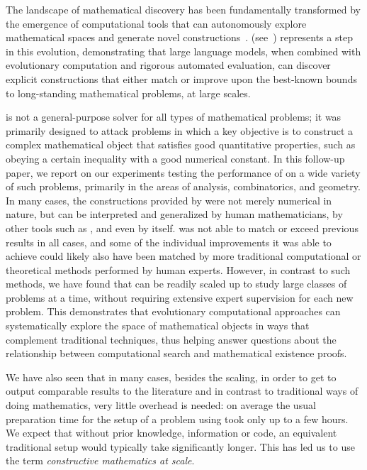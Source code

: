 The landscape of mathematical discovery has been fundamentally transformed by the emergence of computational tools that can autonomously explore mathematical spaces and generate novel constructions~\cite{charton2024patternboost, fawzi2022discovering,  romeraparedes2023mathematical, Wagner2021}.  \AlphaEvolve (see~\cite{novikov2025alphaevolve}) represents a step in this evolution, demonstrating that large language models, when combined with evolutionary computation and rigorous automated evaluation, can discover explicit constructions that either match or improve upon the best-known bounds to long-standing mathematical problems, at large scales.

\AlphaEvolve is not a general-purpose solver for all types of mathematical problems; it was primarily designed to attack problems in which a key objective is to construct a complex mathematical object that satisfies good quantitative properties, such as obeying a certain inequality with a good numerical constant.  In this follow-up paper, we report on our experiments testing the performance of \AlphaEvolve on a wide variety of such problems, primarily in the areas of analysis, combinatorics, and geometry.  In many cases, the constructions provided by \AlphaEvolve were not merely numerical in nature, but can be interpreted and generalized by human mathematicians, by other tools such as \DeepThink, and even by \AlphaEvolve itself.  \AlphaEvolve was not able to match or exceed previous results in all cases, and some of the individual improvements it was able to achieve could likely also have been matched by more traditional computational or theoretical methods performed by human experts.  However, in contrast to such methods, we have found that \AlphaEvolve can be readily scaled up to study large classes of problems at a time, without requiring extensive expert supervision for each new problem.  This demonstrates that evolutionary computational approaches can systematically explore the space of mathematical objects in ways that complement traditional techniques, thus helping answer questions about the relationship between computational search and mathematical existence proofs.

We have also seen that in many cases, besides the scaling, in order to get \AlphaEvolve to output comparable results to the literature and in contrast to traditional ways of doing mathematics, very little overhead is needed: on average the usual preparation time for the setup of a problem using \AlphaEvolve took only up to a few hours. We expect that without prior knowledge, information or code, an equivalent traditional setup would typically take significantly longer. This has led us to use the term \textit{constructive mathematics at scale}.


